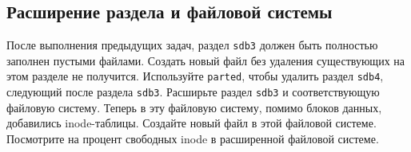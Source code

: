 \documentclass{article}
\begin{document}
\subsection{Расширение раздела и файловой системы}
После выполнения предыдущих задач, раздел \texttt{sdb3} должен быть полностью заполнен пустыми файлами. Создать новый файл без удаления существующих на этом разделе не получится. Используйте \texttt{parted}, чтобы удалить раздел \texttt{sdb4}, следующий после раздела \texttt{sdb3}. Расширьте раздел \texttt{sdb3} и соответствующую файловую систему. Теперь в эту файловую систему, помимо блоков данных, добавились inode-таблицы. Создайте новый файл в этой файловой системе. Посмотрите на процент свободных inode в расширенной файловой системе.

\iffalse
\newpage
~
\newpage

\subsection*{Идеи}
\begin{itemize}
\item Вопросы по ext2
\begin{itemize}
\item Сколько памяти может занимать 1 файл в ext2 (block=4kb, размер указателя = 4 или 8).
\end{itemize}
\end{itemize}


\fi
\end{document}
